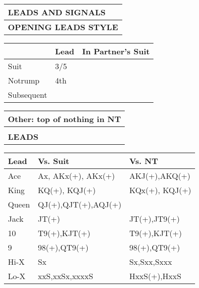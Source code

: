 \documentclass{article}
\begin{document}
\begin{minipage}{90mm}
	\begin{tabular}{| p{88mm} |}
		\hline
		\cellcolor[gray]{0.9} \textbf{LEADS AND SIGNALS} \\ \hline
		\textbf{OPENING LEADS STYLE} \\ \hline
	\end{tabular}
	\begin{tabular}{| p{15.25mm} | p{32mm} | p{32mm} |}
		& Lead & In Partner's Suit \\ \hline
		Suit       &3/5 & \\ \hline
		Notrump    &4th & \\ \hline
		Subsequent & & \\ \hline
	\end{tabular}
	\begin{tabular}{| p{88mm} |}
		Other: top of nothing in NT \\ \hline
		\\ \hline
		\textbf{LEADS} \\ \hline
	\end{tabular}
	\begin{tabular}{| p{15.25mm} | p{32mm} | p{32mm} |}
		Lead & Vs. Suit & Vs. NT \\ \hline
                Ace &Ax, AKx(+), AKx(+) & AKJ(+),AKQ(+) \\ \hline
                King &KQ(+), KQJ(+) &KQx(+), KQJ(+) \\ \hline
                Queen &QJ(+),QJT(+),AQJ(+)  & \\ \hline
                Jack &JT(+) & JT(+),JT9(+) \\ \hline
                10 &T9(+),KJT(+) & T9(+),KJT(+) \\ \hline
                9 &98(+),QT9(+) & 98(+),QT9(+) \\ \hline
                Hi-X & Sx &Sx,Sxx,Sxxx \\ \hline
                Lo-X &xxS,xxSx,xxxxS & HxxS(+),HxxS\\ \hline
	\end{tabular}
	\begin{tabular}{| p{88mm} |}


\end{tabular}
\end{minipage}
\end{document}
